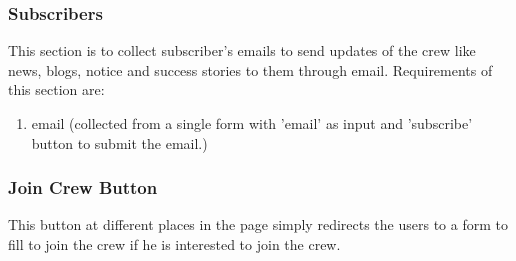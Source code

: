 			\subsubsection{Subscribers}
				This section is to collect subscriber's emails to send updates of the crew like news, blogs, notice and success stories to them through email. Requirements of this section are:
				\begin{enumerate}
					\item email (collected from a single form with 'email' as input and 'subscribe' button to submit the email.)
				\end{enumerate}
			\subsubsection{Join Crew Button}
				This button at different places in the page simply redirects the users to a form to fill to join the crew if he is interested to join the crew.